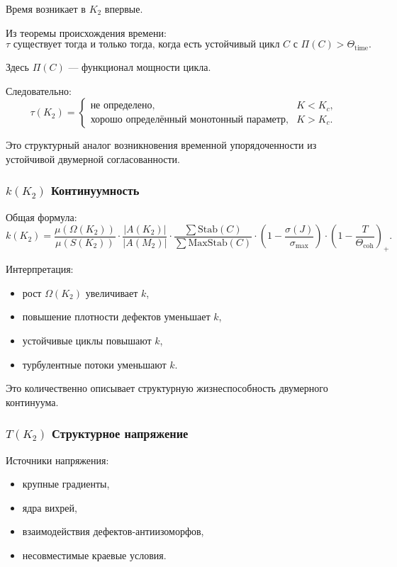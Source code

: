 Время возникает в $K_2$ впервые.

Из теоремы происхождения времени:
\[
\tau \text{ существует тогда и только тогда, когда есть устойчивый цикл }
C \text{ с } \Pi(C) > \Theta_{\mathrm{time}}.
\]

Здесь $\Pi(C)$ — функционал мощности цикла.

Следовательно:
\[
\tau(K_2) =
\begin{cases}
\text{не определено}, & K < K_c, \\
\text{хорошо определённый монотонный параметр}, & K > K_c.
\end{cases}
\]

Это структурный аналог возникновения временной упорядоченности из
устойчивой двумерной согласованности.

\subsubsection{\texorpdfstring{$k(K_2)$}{k(K_2)} Континуумность}

Общая формула:
\[
k(K_2) =
\frac{\mu(\Omega(K_2))}{\mu(S(K_2))}
\cdot
\frac{|A(K_2)|}{|A(M_2)|}
\cdot
\frac{\sum \mathrm{Stab}(C)}{\sum \mathrm{MaxStab}(C)}
\cdot
\left(1 - \frac{\sigma(J)}{\sigma_{\max}}\right)
\cdot
\left(1 - \frac{T}{\Theta_{\mathrm{coh}}}\right)_+.
\]

Интерпретация:
\begin{itemize}
    \item рост $\Omega(K_2)$ увеличивает $k$,
    \item повышение плотности дефектов уменьшает $k$,
    \item устойчивые циклы повышают $k$,
    \item турбулентные потоки уменьшают $k$.
\end{itemize}

Это количественно описывает структурную жизнеспособность двумерного континуума.

\subsubsection{\texorpdfstring{$T(K_2)$}{T(K_2)} Структурное напряжение}

Источники напряжения:
\begin{itemize}
    \item крупные градиенты,
    \item ядра вихрей,
    \item взаимодействия дефектов-антиизоморфов,
    \item несовместимые краевые условия.
\end{itemize}

